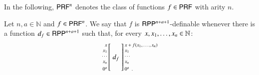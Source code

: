 In the following, $\mathsf{P}\mathsf{RF}^n$ denotes the class of functions $f\in \mathsf{P}\mathsf{RF}$ with arity $n$.

\begin{definition}
\label{definition:RPP-definability of any f in PRF}
Let $n, a\in\mathbb N$ and $ f\in\mathsf{P}\mathsf{RF}^n $. We say that $ f $ is $ \mathsf{RPP}^{n+a+1} $-definable  whenever
there is a function  $ d_f\in\mathsf{RPP}^{n+a+1} $  such that, for every $x, x_1, \ldots, x_n\in\mathbb{N}$:
\begin{align*}
\arraycolsep=1.4pt
\begin{array}{rcl}
 \left. {\scriptsize 
            \begin{array}{r}
             x \\ x_1 \\ \cdots \\ x_n
             \\[1mm]
              0^a
            \end{array} 
         } \right[
 & d_f &
 \left] {\scriptsize 
            \begin{array}{l}
             x + f (x_1, \ldots, x_n) \\ x_1 \\ \cdots \\ x_n
             \\[1mm]
              0^a
            \enspace .
            \end{array} 
        } \right.
\end{array}
\end{align*}
\end{definition}

